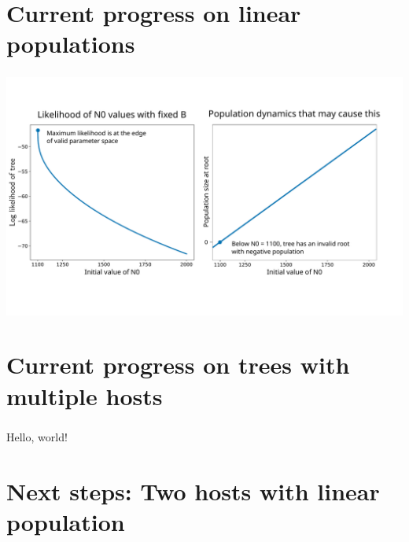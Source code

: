 \documentclass[aspectratio=169]{beamer}
\begin{document}
\section{Current progress on linear populations}

\begin{frame} \frametitle{\insertsection}

    \centering\includegraphics[width=\textwidth]{images/linear-progress}

\end{frame}

\section{Current progress on trees with multiple hosts}

\begin{frame} \frametitle{\insertsection}

    Hello, world!

\end{frame}

\section{Next steps: Two hosts with linear population}
\end{document}
